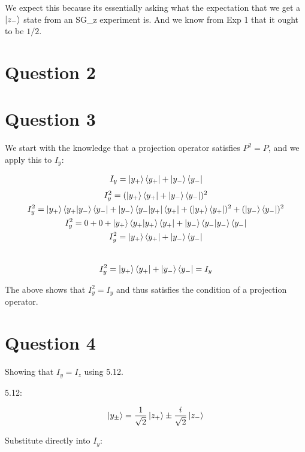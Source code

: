 \documentclass{article}
\begin{document}
    We expect this because its essentially asking what the expectation that we get a $\ket{z_-}$ state
    from an SG\_z experiment is. And we know from Exp 1 that it ought to be $1/2$.


\section{Question 2}




\section{Question 3}

    We start with the knowledge that a projection operator satisfies $P^2 = P$,
    and we apply this to $I_y$:

    \begin{gather}
        I_y = \ket{y_+}\bra{y_+} + \ket{y_-}\bra{y_-}
    \end{gather}
    \begin{gather*}
        I_y^2 = (\ket{y_+}\bra{y_+} + \ket{y_-}\bra{y_-})^2\\
        I_y^2 = \ket{y_+}\braket{y_+|y_-}\bra{y_-} + \ket{y_-}\bra{y_-|y_+}\bra{y_+}
        + (\ket{y_+}\bra{y_+})^2 + (\ket{y_-}\bra{y_-})^2\\
        I_y^2 = 0 + 0 + \ket{y_+}\braket{y_+|y_+}\bra{y_+} + \ket{y_-}\braket{y_-|y_-}\bra{y_-}\\
        I_y^2 = \ket{y_+}\bra{y_+} + \ket{y_-}\bra{y_-}
    \end{gather*}\
    \begin{gather*}
        I_y^2 = \ket{y_+}\bra{y_+} + \ket{y_-}\bra{y_-} = I_y
    \end{gather*}

    The above shows that $I_y^2 = I_y$ and thus satisfies the condition of a projection operator. 


\section{Question 4}

    Showing that $I_y=I_z$ using 5.12.

    5.12:

    \begin{gather}
        \ket{y_\pm} = \frac{1}{\sqrt{2}}\ket{z_+} \pm \frac{i}{\sqrt{2}}\ket{z_-}
    \end{gather}

    Substitute directly into $I_y$:
\end{document}
